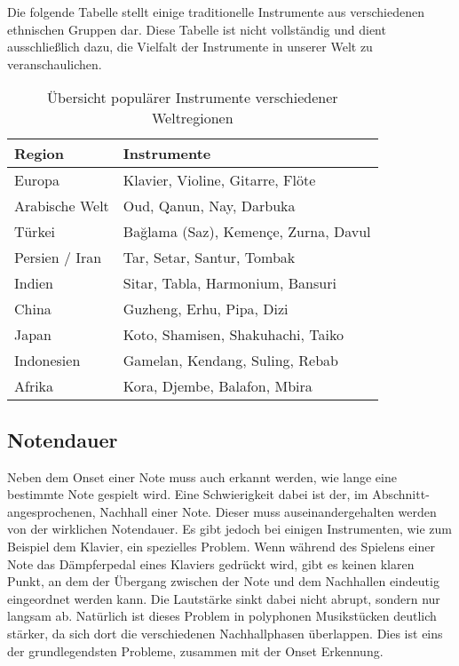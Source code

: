 Die folgende Tabelle stellt einige traditionelle Instrumente aus verschiedenen ethnischen Gruppen dar.
Diese Tabelle ist nicht vollständig und dient ausschließlich dazu,
die Vielfalt der Instrumente in unserer Welt zu veranschaulichen.
\begin{table}[H]
\centering
\begin{tabular}{|l|p{10cm}|}
\hline
\textbf{Region} & \textbf{Instrumente} \\ \hline
Europa & Klavier, Violine, Gitarre, Flöte \\ \hline
Arabische Welt & Oud, Qanun, Nay, Darbuka \\ \hline
Türkei & Bağlama (Saz), Kemençe, Zurna, Davul \\ \hline
Persien / Iran & Tar, Setar, Santur, Tombak \\ \hline
Indien & Sitar, Tabla, Harmonium, Bansuri \\ \hline
China & Guzheng, Erhu, Pipa, Dizi \\ \hline
Japan & Koto, Shamisen, Shakuhachi, Taiko \\ \hline
Indonesien & Gamelan, Kendang, Suling, Rebab \\ \hline
Afrika & Kora, Djembe, Balafon, Mbira \\ \hline
\end{tabular}
\caption{Übersicht populärer Instrumente verschiedener Weltregionen}
\end{table}

\subsection{Notendauer}
Neben dem Onset einer Note muss auch erkannt werden, wie lange eine bestimmte Note gespielt wird.
Eine Schwierigkeit dabei ist der, im Abschnitt- angesprochenen, Nachhall einer Note.
Dieser muss auseinandergehalten werden von der wirklichen Notendauer.
Es gibt jedoch bei einigen Instrumenten, wie zum Beispiel dem Klavier, ein spezielles Problem.
Wenn während des Spielens einer Note das Dämpferpedal eines Klaviers gedrückt wird, gibt es keinen klaren Punkt,
an dem der Übergang zwischen der Note und dem Nachhallen eindeutig eingeordnet werden kann.
Die Lautstärke sinkt dabei nicht abrupt, sondern nur langsam ab.
Natürlich ist dieses Problem in polyphonen Musikstücken deutlich stärker,
da sich dort die verschiedenen Nachhallphasen überlappen.
Dies ist eins der grundlegendsten Probleme, zusammen mit der Onset Erkennung.
\cite{jamshidi2024machine}

